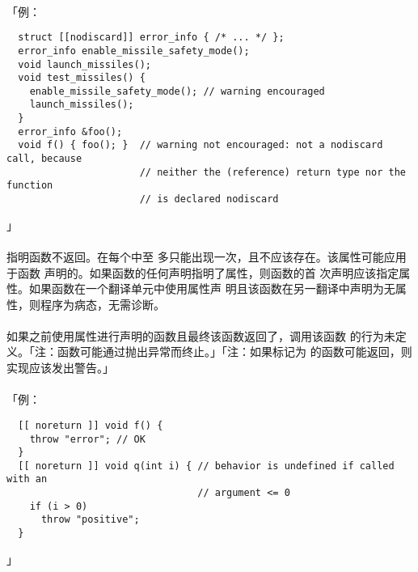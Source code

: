 \paragraph{}
「例：
\begin{lstlisting}
  struct [[nodiscard]] error_info { /* ... */ };
  error_info enable_missile_safety_mode();
  void launch_missiles();
  void test_missiles() {
    enable_missile_safety_mode(); // warning encouraged
    launch_missiles();
  }
  error_info &foo();
  void f() { foo(); }  // warning not encouraged: not a nodiscard call, because
                       // neither the (reference) return type nor the function
                       // is declared nodiscard
\end{lstlisting}」

\paragraph{}
 指明函数不返回。在每个中至
多只能出现一次，且不应该存在。该属性可能应用于函数
声明的。如果函数的任何声明指明了属性，则函数的首
次声明应该指定属性。如果函数在一个翻译单元中使用属性声
明且该函数在另一翻译中声明为无属性，则程序为病态，无需诊断。

\paragraph{}
如果之前使用属性进行声明的函数且最终该函数返回了，调用该函数
的行为未定义。「注：函数可能通过抛出异常而终止。」「注：如果标记为
\tm{[[noreturn]}的函数可能返回，则实现应该发出警告。」

\paragraph{}
「例：
\begin{lstlisting}
  [[ noreturn ]] void f() {
    throw "error"; // OK
  }
  [[ noreturn ]] void q(int i) { // behavior is undefined if called with an
                                 // argument <= 0 
    if (i > 0)
      throw "positive";
  }
\end{lstlisting}」
